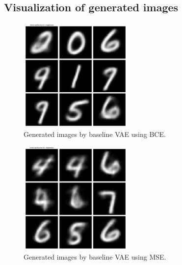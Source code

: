 \begin{appendices}

\section{Visualization of generated images}\label{appendiximages}

\begin{figure}[H]
    \centering
    \includegraphics[width=0.5\textwidth]{code/figs/mnist-vanilla-bce-h2--reconstruction.png}
    \caption{Generated images by baseline VAE using BCE.}
    \label{fig:VAE-BCE-images}
\end{figure}

\begin{figure}[H]
    \centering
    \includegraphics[width=0.5\textwidth]{code/figs/mnist-vanilla-mse-h2--reconstruction.png}
    \caption{Generated images by baseline VAE using MSE.}
    \label{fig:VAE-MSE-images}
\end{figure}


\end{appendices}
